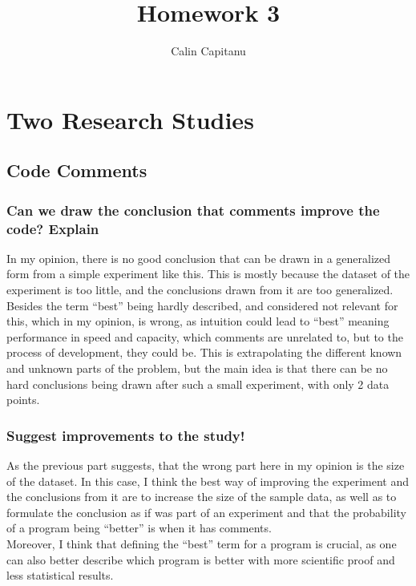 \documentclass[english]{report}
\begin{document}
\title{Homework 3}
\author{Calin Capitanu}

\maketitle

\clearpage
\chapter{Two Research Studies}
\section{Code Comments}

\subsection{Can we draw the conclusion that comments improve the code? Explain}

In my opinion, there is no good conclusion that can be drawn in a generalized form from a simple experiment like this. This is mostly because the dataset of the experiment is too little, and the conclusions drawn from it are too generalized. \\
Besides the term ``best'' being hardly described, and considered not relevant for this, which in my opinion, is wrong, as intuition could lead to ``best'' meaning performance in speed and capacity, which comments are unrelated to, but to the process of development, they could be. This is extrapolating the different known and unknown parts of the problem, but the main idea is that there can be no hard conclusions being drawn after such a small experiment, with only 2 data points.

\subsection{Suggest improvements to the study!}

As the previous part suggests, that the wrong part here in my opinion is the size of the dataset. In this case, I think the best way of improving the experiment and the conclusions from it are to increase the size of the sample data, as well as to formulate the conclusion as if was part of an experiment and that the probability of a program being ``better'' is when it has comments.\\
Moreover, I think that defining the ``best'' term for a program is crucial, as one can also better describe which program is better with more scientific proof and less statistical results.
\end{document}
